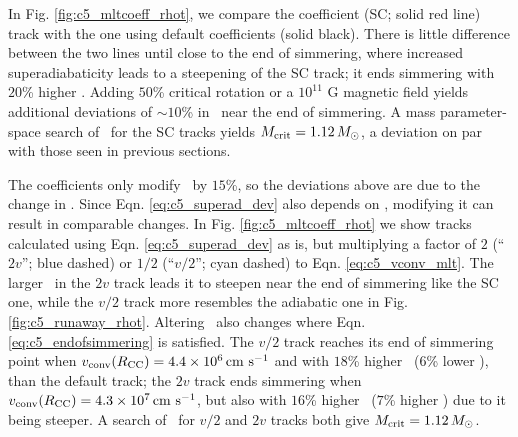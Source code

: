 In Fig. \ref{fig:c5_mltcoeff_rhot}, we compare the \citeal{stev79} coefficient (SC; solid red line) track with the one using default coefficients (solid black).  There is little difference between the two lines until close to the end of simmering, where increased superadiabaticity leads to a steepening of the SC track; it ends simmering with $20$\% higher \rhoc.  Adding $50$\% critical rotation or a $10^{11}$ G magnetic field yields additional deviations of $\sim10$\% in \rhoc\ near the end of simmering.  A mass parameter-space search of \Mcrit\ for the SC tracks yields $\Mcrit = 1.12\,\Msun$, a deviation on par with those seen in previous sections.


The \citeal{stev79} coefficients only modify \vconv\ by $15$\%, so the deviations above are due to the change in \deltanab.  Since Eqn. \ref{eq:c5_superad_dev} also depends on \vconv, modifying it can result in comparable changes.  In Fig. \ref{fig:c5_mltcoeff_rhot} we show tracks calculated using Eqn. \ref{eq:c5_superad_dev} as is, but multiplying a factor of $2$ (``$2v$''; blue dashed) or $1/2$ (``$v/2$''; cyan dashed) to Eqn. \ref{eq:c5_vconv_mlt}.  The larger \deltanab\ in the $2v$ track leads it to steepen near the end of simmering like the SC one, while the $v/2$ track more resembles the adiabatic one in Fig. \ref{fig:c5_runaway_rhot}.  Altering \vconv\ also changes where Eqn. \ref{eq:c5_endofsimmering} is satisfied.  The $v/2$ track reaches its end of simmering point when $\vconvrcc = 4.4\times10^6\,\cmpsec$ and with $18$\% higher \rhoc\ ($6$\% lower \Tc), than the default track; the $2v$ track ends simmering when $\vconvrcc = 4.3\times10^7\,\cmpsec$, but also with $16$\% higher \rhoc\ ($7$\% higher \Tc) due to it being steeper.  A search of \Mcrit\ for $v/2$ and $2v$ tracks both give $\Mcrit = 1.12\,\Msun$.



